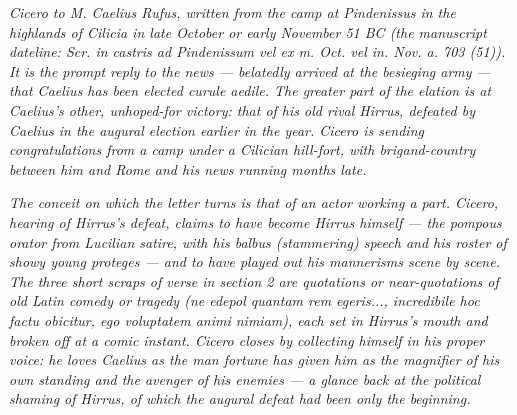 
\textit{Cicero to M. Caelius Rufus, written from the
camp at Pindenissus in the highlands of Cilicia in late
October or early November 51 BC (the manuscript dateline:
\textit{Scr. in castris ad Pindenissum vel ex m. Oct.
vel in. Nov. a. 703 (51)}). It is the prompt reply
to the news --- belatedly arrived at the besieging
army --- that Caelius has been elected curule aedile.
The greater part of the elation is at Caelius's other,
unhoped-for victory: that of his old rival Hirrus,
defeated by Caelius in the augural election earlier in
the year. Cicero is sending congratulations from a
camp under a Cilician hill-fort, with brigand-country
between him and Rome and his news running months
late.}

\textit{The conceit on which the letter turns is that
of an actor working a part. Cicero, hearing of Hirrus's
defeat, claims to have become Hirrus himself --- the
pompous orator from Lucilian satire, with his
\textit{balbus} (stammering) speech and his roster of
showy young proteges --- and to have played out his
mannerisms scene by scene. The three short scraps of
verse in section 2 are quotations or near-quotations of
old Latin comedy or tragedy (\textit{ne edepol quantam
rem egeris...}, \textit{incredibile hoc factu obicitur},
\textit{ego voluptatem animi nimiam}), each set in
Hirrus's mouth and broken off at a comic instant.
Cicero closes by collecting himself in his proper voice:
he loves Caelius as the man fortune has given him as
the magnifier of his own standing and the avenger of
his enemies --- a glance back at the political shaming
of Hirrus, of which the augural defeat had been only
the beginning.}
